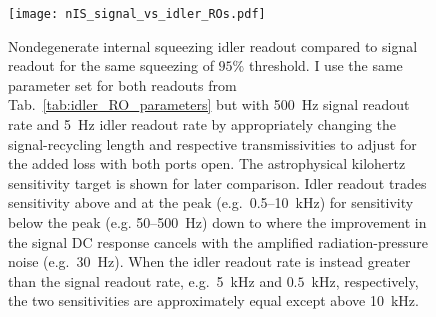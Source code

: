 \begin{figure}
    \centering
    \texttt{[image: nIS\_signal\_vs\_idler\_ROs.pdf]}
    \caption{ Nondegenerate internal squeezing idler readout compared to signal readout for the same squeezing of $95\%$ threshold. I use the same parameter set for both readouts from Tab.~\ref{tab:idler_RO_parameters} but with 500~Hz signal readout rate and 5~Hz idler readout rate by appropriately changing the signal-recycling length and respective transmissivities to adjust for the added loss with both ports open. The astrophysical kilohertz sensitivity target is shown for later comparison. Idler readout trades sensitivity above and at the peak (e.g.\ 0.5--10~kHz) for sensitivity below the peak (e.g. 50--500~Hz) down to where the improvement in the signal DC response cancels with the amplified radiation-pressure noise (e.g.\ 30~Hz). When the idler readout rate is instead greater than the signal readout rate, e.g.\ 5~kHz and $0.5$~kHz, respectively, the two sensitivities are approximately equal except above 10~kHz. %
    }
    \label{fig:nIS_signal_vs_idler_ROs}
\end{figure}

